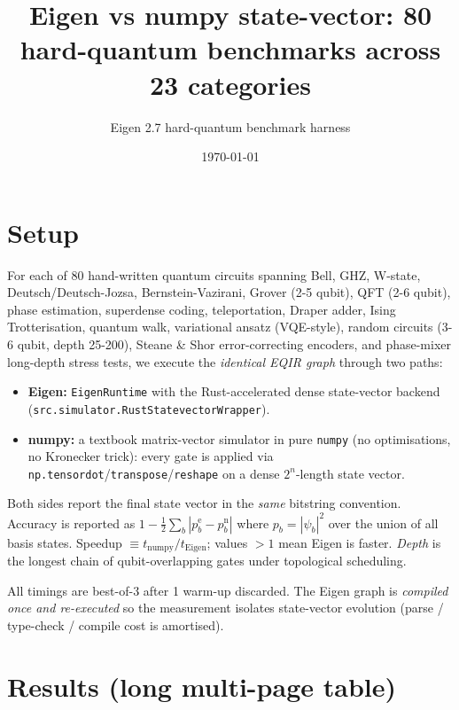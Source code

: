\documentclass[11pt,a4paper]{article}
\title{Eigen vs numpy state-vector: 80 hard-quantum benchmarks across 23 categories}
\author{Eigen 2.7 hard-quantum benchmark harness}
\date{\today}
\begin{document}
\maketitle

\section{Setup}

For each of 80 hand-written quantum circuits spanning Bell,
GHZ, W-state, Deutsch/Deutsch-Jozsa, Bernstein-Vazirani, Grover (2-5 qubit),
QFT (2-6 qubit), phase estimation, superdense coding, teleportation, Draper
adder, Ising Trotterisation, quantum walk, variational ansatz (VQE-style),
random circuits (3-6 qubit, depth 25-200), Steane \& Shor error-correcting
encoders, and phase-mixer long-depth stress tests,
we execute the \emph{identical EQIR graph} through two paths:
\begin{itemize}
  \item \textbf{Eigen:} \texttt{EigenRuntime} with the Rust-accelerated dense
      state-vector backend
      (\texttt{src.simulator.\allowbreak RustStatevectorWrapper}).
  \item \textbf{numpy:} a textbook matrix-vector simulator in pure
      \texttt{numpy} (no optimisations, no Kronecker trick): every gate is
      applied via \texttt{np.tensordot}/\texttt{transpose}/\texttt{reshape}
      on a dense $2^n$-length state vector.
\end{itemize}
Both sides report the final state vector in the \emph{same} bitstring
convention. Accuracy is reported as $1-\tfrac{1}{2}\sum_b|p^{\text{e}}_b -
p^{\text{n}}_b|$ where $p_b = |\psi_b|^2$ over the union of all basis states.
Speedup $\equiv t_{\text{numpy}}/t_{\text{Eigen}}$; values $>1$ mean Eigen is
faster. \emph{Depth} is the longest chain of qubit-overlapping gates under
topological scheduling.

All timings are best-of-3 after 1 warm-up discarded. The Eigen graph is
\emph{compiled once and re-executed} so the measurement isolates state-vector
evolution (parse / type-check / compile cost is amortised).

\section{Results (long multi-page table)}
\end{document}
